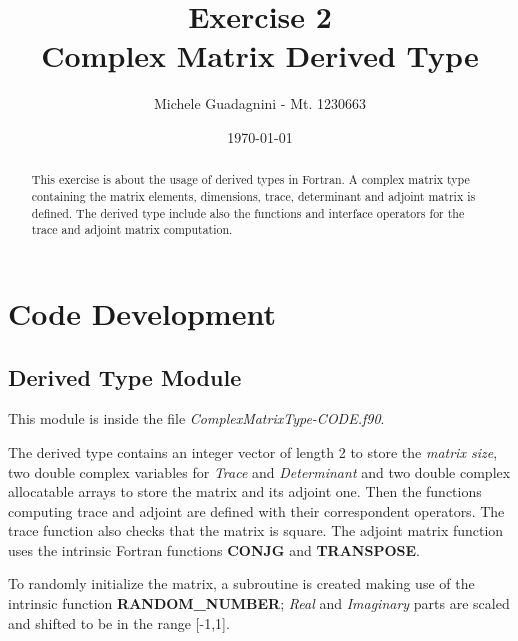 \documentclass[11pt,a4paper]{article}
\author{Michele Guadagnini - Mt. 1230663}
\title{\textbf{Exercise 2 \\ Complex Matrix Derived Type}}
\date{\today}
\begin{document}
\maketitle

\vspace{80pt}
\begin{abstract}
	This exercise is about the usage of derived types in Fortran. 
	A complex matrix type containing the matrix elements, dimensions, trace, determinant and adjoint matrix is defined. 
	The derived type include also the functions and interface operators for the trace and adjoint matrix computation. 
\end{abstract}

\newpage


\section{Code Development} %
\subsection{Derived Type Module}
This module is inside the file \textit{ComplexMatrixType-CODE.f90}.

The derived type contains an integer vector of length 2 to store the \textit{matrix size}, two double complex variables for \textit{Trace} and \textit{Determinant} and two double complex allocatable arrays to store the matrix and its adjoint one.
Then the functions computing trace and adjoint are defined with their correspondent operators.
The trace function also checks that the matrix is square.
The adjoint matrix function uses the intrinsic Fortran functions \textbf{CONJG} and \textbf{TRANSPOSE}.

To randomly initialize the matrix, a subroutine is created making use of the intrinsic function \textbf{RANDOM\_NUMBER}; \textit{Real} and \textit{Imaginary} parts are scaled and shifted to be in the range [-1,1]. 
\end{document}
